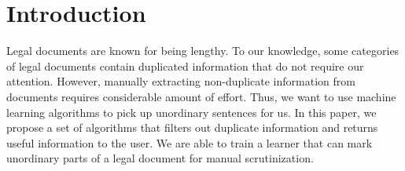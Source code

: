 \documentclass[conference,compsoc]{IEEEtran}
\begin{document}
\maketitle




%
\IEEEpeerreviewmaketitle



\section{Introduction}
    Legal documents are known for being lengthy. To our knowledge, some categories of legal documents contain duplicated 
    information that do not require our attention. However, manually extracting non-duplicate information from documents requires
    considerable amount of effort. Thus, we want to use machine learning algorithms to pick up unordinary sentences for us.
    In this paper, we propose a set of algorithms that filters out duplicate information and 
    returns useful information to the user. We are able to train a learner that can mark unordinary parts of a legal 
    document for manual scrutinization. 
\end{document}
